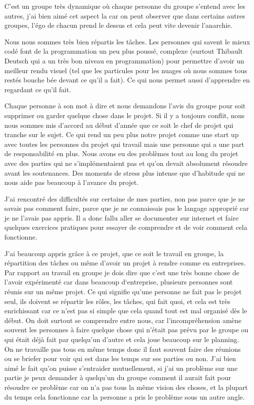\documentclass[11pt]{report}
\begin{document}
C’est un groupe très dynamique où chaque personne du groupe s’entend avec les autres, j’ai bien aimé cet aspect la car on peut observer que dans certains autres groupes, l’égo de chacun prend le dessus et cela peut vite devenir l’anarchie.

Nous nous sommes très bien répartis les tâches. Les personnes qui savent le mieux codé font de la programmation un peu plus poussé, complexe (surtout Thibault Deutsch qui a un très bon niveau en programmation) pour permettre d’avoir un meilleur rendu visuel (tel que les particules pour les nuages où nous sommes tous restés bouche bée devant ce qu’il a fait). Ce qui nous permet aussi d’apprendre en regardant ce qu’il fait.

Chaque personne à son mot à dire et nous demandons l’avis du groupe pour soit supprimer ou garder quelque chose dans le projet. Si il y a toujours conflit, nous nous sommes mis d’accord au début d’année que ce soit le chef de projet qui tranche sur le sujet. Ce qui rend un peu plus notre projet comme une start up avec toutes les personnes du projet qui travail mais une personne qui a une part de responsabilité en plus.
Nous avons eu des problèmes tout au long du projet avec des parties qui ne s’implémentaient pas et qu’on devait absolument résoudre avant les soutenances. Des moments de stress plus intense que d’habitude qui ne nous aide pas beaucoup à l’avance du projet.

J’ai rencontré des difficultés sur certaine de mes parties, non pas parce que je ne savais pas comment faire, parce que je ne connaissais pas le langage approprié car je ne l’avais pas appris. Il a donc fallu aller se documenter sur internet et faire quelques exercices pratiques pour essayer de comprendre et de voir comment cela fonctionne.

J’ai beaucoup appris grâce à ce projet, que ce soit le travail en groupe, la répartition des tâches ou même d’avoir un projet à rendre comme en entreprises. Par rapport au travail en groupe je dois dire que c’est une très bonne chose de l’avoir expérimenté car dans beaucoup d‘entreprise, plusieurs personnes sont réunis sur un même projet. Ce qui signifie qu’une personne ne fait pas le projet seul, ils doivent se répartir les rôles, les tâches, qui fait quoi, et cela est très enrichissant car ce n’est pas si simple que cela quand tout est mal organisé dès le début. On doit surtout se comprendre entre nous, car l’incompréhension amène souvent les personnes à faire quelque chose qui n’était pas prévu par le groupe ou qui était déjà fait par quelqu’un d’autre et cela joue beaucoup sur le planning. On ne travaille pas tous en même temps donc il faut souvent faire des réunions ou se briefer pour voir qui est dans les temps sur ses parties ou non. J’ai bien aimé le fait qu’on puisse s’entraider mutuellement, si j’ai un problème sur une partie je peux demander à quelqu’un du groupe comment il aurait fait pour résoudre ce problème car on n’a pas tous la même vision des choses, et la plupart du temps cela fonctionne car la personne a pris le problème sous un autre angle.
\end{document}
